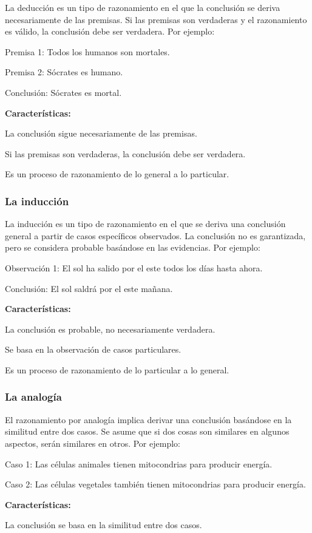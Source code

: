 La deducción es un tipo de razonamiento en el que la conclusión se deriva necesariamente de las premisas. Si las premisas son verdaderas y el razonamiento es válido, la conclusión debe ser verdadera. Por ejemplo:

Premisa 1: Todos los humanos son mortales.

Premisa 2: Sócrates es humano.

Conclusión: Sócrates es mortal.

\textbf{Características:}

La conclusión sigue necesariamente de las premisas.

Si las premisas son verdaderas, la conclusión debe ser verdadera.

Es un proceso de razonamiento de lo general a lo particular.

\subsubsection{La inducción}
La inducción es un tipo de razonamiento en el que se deriva una conclusión general a partir de casos específicos observados. La conclusión no es garantizada, pero se considera probable basándose en las evidencias. Por ejemplo:

Observación 1: El sol ha salido por el este todos los días hasta ahora.

Conclusión: El sol saldrá por el este mañana.

\textbf{Características:}

La conclusión es probable, no necesariamente verdadera.

Se basa en la observación de casos particulares.

Es un proceso de razonamiento de lo particular a lo general.

\subsubsection{La analogía}
El razonamiento por analogía implica derivar una conclusión basándose en la similitud entre dos casos. Se asume que si dos cosas son similares en algunos aspectos, serán similares en otros. Por ejemplo:

Caso 1: Las células animales tienen mitocondrias para producir energía.

Caso 2: Las células vegetales también tienen mitocondrias para producir energía.

\textbf{Características:}

La conclusión se basa en la similitud entre dos casos.

